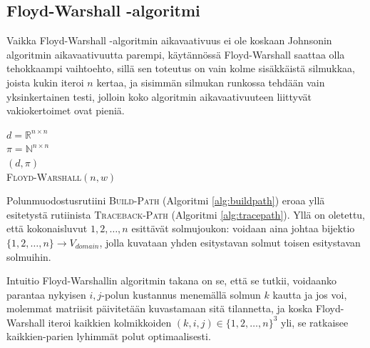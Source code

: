 \documentclass[finnish]{tktltiki2}
\newenvironment{finalgo}[1][htb]{
  \renewcommand{\algorithmcfname}{Algoritmi}
  \begin{algorithm}[#1]
}{\end{algorithm}}
\theoremstyle{definition}
\theoremstyle{remark}
\begin{document}
\subsection{Floyd-Warshall -algoritmi}
Vaikka Floyd-Warshall -algoritmin aikavaativuus ei ole koskaan Johnsonin algoritmin aikavaativuutta parempi, käytännössä Floyd-Warshall saattaa olla tehokkaampi vaihtoehto, sillä sen toteutus on vain kolme sisäkkäistä silmukkaa, joista kukin iteroi $n$ kertaa, ja sisimmän silmukan runkossa tehdään vain yksinkertainen testi, jolloin koko algoritmin aikavaativuuteen liittyvät vakiokertoimet ovat pieniä.
\begin{finalgo}[h]
  $d = \mathbb{R}^{n \times n}$ \\
  $\pi = \mathbb{N}^{n \times n}$ \\
   \KwRet $(d, \pi)$ \\
\caption{\textsc{Floyd-Warshall}$(n, w)$}
\label{alg:warshall}
\end{finalgo}
Polunmuodostusrutiini \textsc{Build-Path} (Algoritmi \ref{alg:buildpath}) eroaa yllä esitetystä rutiinista \textsc{Traceback-Path} (Algoritmi \ref{alg:tracepath}). Yllä on oletettu, että kokonaisluvut $1, 2, \dots, n$ esittävät solmujoukon: voidaan aina johtaa bijektio $\{ 1, 2, \dots, n \} \to V_{domain}$, jolla kuvataan yhden esitystavan solmut toisen esitystavan solmuihin.

Intuitio Floyd-Warshallin algoritmin takana on se, että se tutkii, voidaanko parantaa nykyisen $i, j$-polun kustannus menemällä solmun $k$ kautta ja jos voi, molemmat matriisit päivitetään kuvastamaan sitä tilannetta, ja koska Floyd-Warshall iteroi kaikkien kolmikkoiden $(k, i, j) \in \{ 1, 2, \dots, n \}^3$
yli, se ratkaisee kaikkien-parien lyhimmät polut optimaalisesti.
\end{document}
